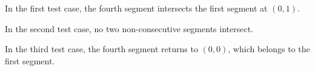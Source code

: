 In the first test case, the fourth segment intersects the first segment at $(0,1)$.

In the second test case, no two non-consecutive segments intersect.

In the third test case, the fourth segment returns to $(0,0)$, which belongs to the first segment.
